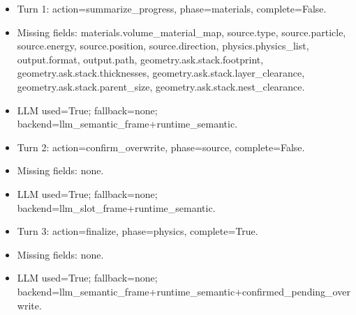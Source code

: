 \documentclass[11pt]{ctexart}
\begin{document}
\begin{itemize}
\item Turn 1: action=summarize\_progress, phase=materials, complete=False.
\item Missing fields: materials.volume\_material\_map, source.type, source.particle, source.energy, source.position, source.direction, physics.physics\_list, output.format, output.path, geometry.ask.stack.footprint, geometry.ask.stack.thicknesses, geometry.ask.stack.layer\_clearance, geometry.ask.stack.parent\_size, geometry.ask.stack.nest\_clearance.
\item LLM used=True; fallback=none; backend=llm\_semantic\_frame+runtime\_semantic.
\item Turn 2: action=confirm\_overwrite, phase=source, complete=False.
\item Missing fields: none.
\item LLM used=True; fallback=none; backend=llm\_slot\_frame+runtime\_semantic.
\item Turn 3: action=finalize, phase=physics, complete=True.
\item Missing fields: none.
\item LLM used=True; fallback=none; backend=llm\_semantic\_frame+runtime\_semantic+confirmed\_pending\_overwrite.
\end{itemize}
\end{document}
